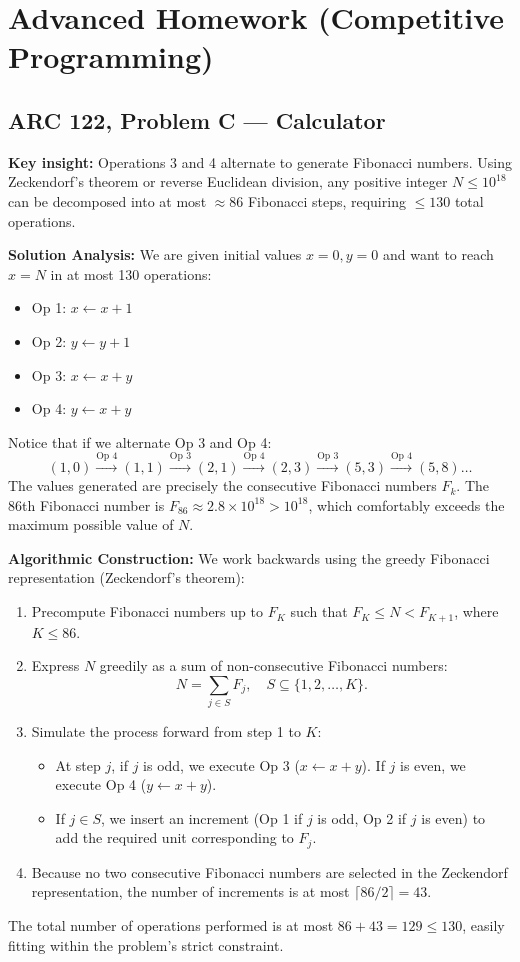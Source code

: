 \documentclass[12pt]{article}
\newcommand{\insight}[1]{\par\medskip\noindent\textbf{Key insight:} #1}
\begin{document}
\section{Advanced Homework (Competitive Programming)}

\subsection{ARC 122, Problem C --- Calculator}

\insight{Operations 3 and 4 alternate to generate Fibonacci numbers. Using Zeckendorf's theorem or reverse Euclidean division, any positive integer $N \le 10^{18}$ can be decomposed into at most $\approx 86$ Fibonacci steps, requiring $\le 130$ total operations.}

\textbf{Solution Analysis:}
We are given initial values $x = 0, y = 0$ and want to reach $x = N$ in at most 130 operations:
\begin{itemize}
    \item Op 1: $x \leftarrow x + 1$
    \item Op 2: $y \leftarrow y + 1$
    \item Op 3: $x \leftarrow x + y$
    \item Op 4: $y \leftarrow x + y$
\end{itemize}
Notice that if we alternate Op 3 and Op 4:
\[
(1, 0) \xrightarrow{\text{Op 4}} (1, 1) \xrightarrow{\text{Op 3}} (2, 1) \xrightarrow{\text{Op 4}} (2, 3) \xrightarrow{\text{Op 3}} (5, 3) \xrightarrow{\text{Op 4}} (5, 8) \dots
\]
The values generated are precisely the consecutive Fibonacci numbers $F_k$.
The 86th Fibonacci number is $F_{86} \approx 2.8 \times 10^{18} > 10^{18}$, which comfortably exceeds the maximum possible value of $N$.

\textbf{Algorithmic Construction:}
We work backwards using the greedy Fibonacci representation (Zeckendorf's theorem):
\begin{enumerate}
    \item Precompute Fibonacci numbers up to $F_K$ such that $F_K \le N < F_{K+1}$, where $K \le 86$.
    \item Express $N$ greedily as a sum of non-consecutive Fibonacci numbers:
    \[
    N = \sum_{j \in S} F_j, \quad S \subseteq \{1, 2, \dots, K\}.
    \]
    \item Simulate the process forward from step 1 to $K$:
    \begin{itemize}
        \item At step $j$, if $j$ is odd, we execute Op 3 ($x \leftarrow x + y$). If $j$ is even, we execute Op 4 ($y \leftarrow x + y$).
        \item If $j \in S$, we insert an increment (Op 1 if $j$ is odd, Op 2 if $j$ is even) to add the required unit corresponding to $F_j$.
    \end{itemize}
    \item Because no two consecutive Fibonacci numbers are selected in the Zeckendorf representation, the number of increments is at most $\lceil 86 / 2 \rceil = 43$.
\end{enumerate}
The total number of operations performed is at most $86 + 43 = 129 \le 130$, easily fitting within the problem's strict constraint.
\end{document}
